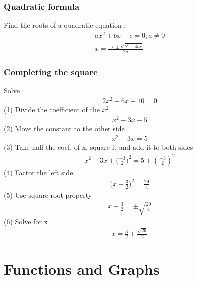 \documentclass[10pt,onecolumn]{article}
\begin{document}
\section{Quadratic formula}
Find the roots of a quadratic equation : \\
\begin{align*}
ax^2 + bx + c = 0; a \neq 0  \\
x = \frac{-b \pm \sqrt{b^2 - 4ac}}{2a} 
\end{align*}

\pagebreak
\section{Completing the square}
Solve : \\
\begin{align*}
2x^2 - 6x - 10 = 0
\end{align*}
(1) Divide the coefficient of the $x^2$ \\
\begin{align*}
x^2 -3x - 5
\end{align*}
(2) Move the constant to the other side \\
\begin{align*}
x^2 - 3x = 5 
\end{align*}
(3) Take half the coef. of x, square it and add it to both sides \\
\begin{align*}
x^2 - 3x + \bigg(\frac{-3}{2}\Big)^2 = 5 + \left(\frac{-3}{2}\right)^2
\end{align*}
(4) Factor the left side \\
\begin{align*}
\bigg(x - \frac{3}{2}\bigg)^2 = \frac{29}{4}
\end{align*}
(5) Use square root property \\
\begin{align*}
x - \frac{3}{2} = \pm \sqrt{\frac{29}{4}}
\end{align*}
(6) Solve for x \\
\begin{align*}
x = \frac{3}{2} \pm \frac{\sqrt{29}}{2}
\end{align*}
\pagebreak

\part{Functions and Graphs}
\end{document}
